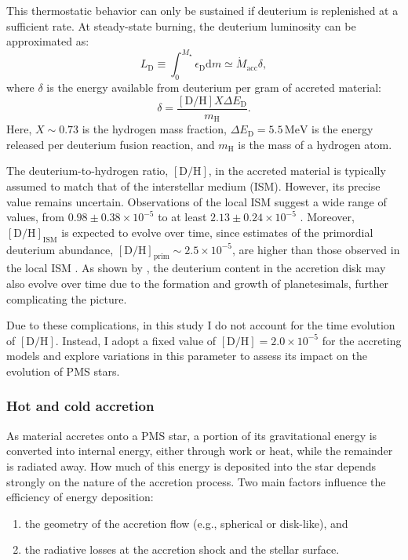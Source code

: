\documentclass[12pt,a4paper]{article}
\newcommand{\mr}{\mathrm}
\newcommand{\dd}[1]{\mathrm{d}#1}
\begin{document}
This thermostatic behavior can only be sustained if deuterium is replenished at a sufficient rate. At steady-state burning, the deuterium luminosity can be approximated as:
\begin{equation}
  L_\mr{D} \equiv \int_0^{M_\star} \epsilon_\mr{D}\dd{m} \simeq \dot{M}_\mr{acc} \delta,
\end{equation}
where $\delta$ is the energy available from deuterium per gram of accreted material:
\begin{equation}
  \delta = \frac{[\mr{D/H}]X\Delta E_\mr{D}}{m_\mr{H}}.
\end{equation}
Here, $X \sim 0.73$ is the hydrogen mass fraction, $\Delta E_\mr{D} = 5.5\,\mr{MeV}$ is the energy released per deuterium fusion reaction, and $m_\mr{H}$ is the mass of a hydrogen atom.

The deuterium-to-hydrogen ratio, $[\mr{D/H}]$, in the accreted material is typically assumed to match that of the interstellar medium (ISM). However, its precise value remains uncertain. Observations of the local ISM suggest a wide range of values, from $0.98 \pm 0.38 \times 10^{-5}$ \parencite{HebrardEtAl2005} to at least $2.13 \pm 0.24 \times 10^{-5}$ \parencite{LinskyEtAl2006}. Moreover, $[\mr{D/H}]_\mr{ISM}$ is expected to evolve over time, since estimates of the primordial deuterium abundance, $[\mr{D/H}]_\mr{prim} \sim 2.5 \times 10^{-5}$, are higher than those observed in the local ISM \parencite[e.g.,][]{Prantzos2007}. As shown by \textcite{KunitomoGuillot2021}, the deuterium content in the accretion disk may also evolve over time due to the formation and growth of planetesimals, further complicating the picture.

Due to these complications, in this study I do not account for the time evolution of $[\mr{D}/\mr{H}]$. Instead, I adopt a fixed value of $[\mr{D}/\mr{H}] = 2.0 \times 10^{-5}$ for the accreting models and explore variations in this parameter to assess its impact on the evolution of PMS stars.

\subsubsection{Hot and cold accretion}
\label{sec:hot_cold_accretion}

As material accretes onto a PMS star,  a portion of its gravitational energy is converted into internal energy, either through work or heat, while the remainder is radiated away. How much of this energy is deposited into the star depends strongly on the nature of the accretion process. Two main factors influence the efficiency of energy deposition:
\begin{enumerate}
  \item the geometry of the accretion flow (e.g., spherical or disk-like), and
  \item the radiative losses at the accretion shock and the stellar surface.
\end{enumerate}
\end{document}
